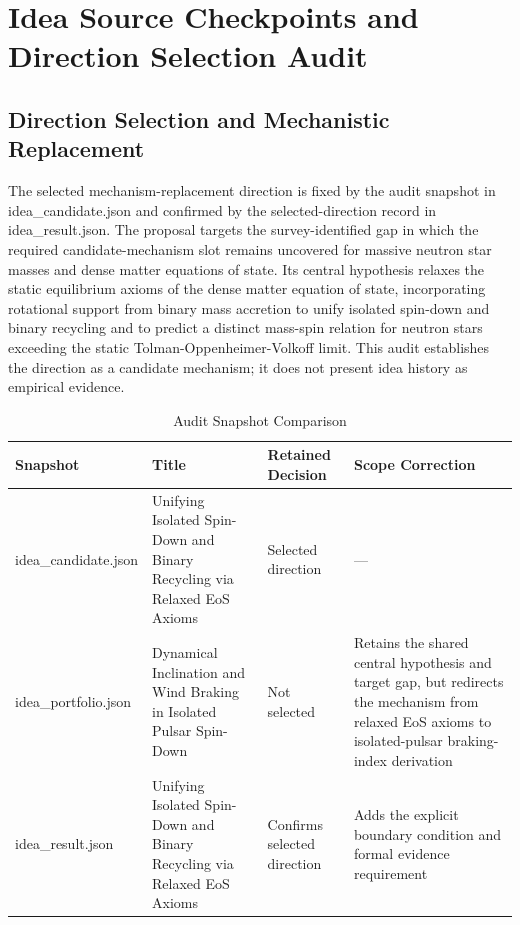 \documentclass[conference]{IEEEtran}
\begin{document}
\section{Idea Source Checkpoints and Direction Selection Audit}
\subsection{Direction Selection and Mechanistic Replacement}
The selected mechanism-replacement direction is fixed by the audit snapshot in idea\_candidate.json and confirmed by the selected-direction record in idea\_result.json. The proposal targets the survey-identified gap in which the required candidate-mechanism slot remains uncovered for massive neutron star masses and dense matter equations of state. Its central hypothesis relaxes the static equilibrium axioms of the dense matter equation of state, incorporating rotational support from binary mass accretion to unify isolated spin-down and binary recycling and to predict a distinct mass-spin relation for neutron stars exceeding the static Tolman-Oppenheimer-Volkoff limit. This audit establishes the direction as a candidate mechanism; it does not present idea history as empirical evidence.

\begin{table}[htbp]
\centering
\footnotesize
\setlength{\tabcolsep}{3pt}
\renewcommand{\arraystretch}{1.12}
\caption{Audit Snapshot Comparison}
\label{tab:appendix-idea-evolution-b2}
\begin{tabular}{|p{}|p{}|p{}|p{}|}
\hline
Snapshot & Title & Retained Decision & Scope Correction \\\hline
idea\_candidate.json & Unifying Isolated Spin-Down and Binary Recycling via Relaxed EoS Axioms & Selected direction & --- \\\hline
idea\_portfolio.json & Dynamical Inclination and Wind Braking in Isolated Pulsar Spin-Down & Not selected & Retains the shared central hypothesis and target gap, but redirects the mechanism from relaxed EoS axioms to isolated-pulsar braking-index derivation \\\hline
idea\_result.json & Unifying Isolated Spin-Down and Binary Recycling via Relaxed EoS Axioms & Confirms selected direction & Adds the explicit boundary condition and formal evidence requirement \\\hline
\end{tabular}
\end{table}
\end{document}
